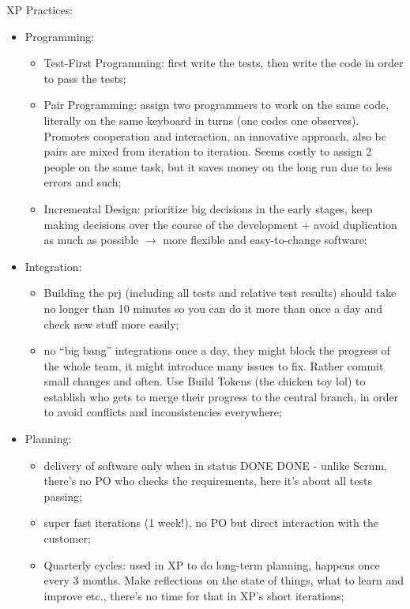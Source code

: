 \noindent XP Practices:
\begin{itemize}
    \item Programming:
    \begin{itemize}
        \item Test-First Programming: first write the tests, then write the code in order to pass the tests;
        \item Pair Programming: assign two programmers to work on the same code, literally on the same keyboard in turns (one codes one observes). Promotes cooperation and interaction, an innovative approach, also bc pairs are mixed from iteration to iteration. Seems costly to assign 2 people on the same task, but it saves money on the long run due to less errors and such;
        \item Incremental Design: prioritize big decisions in the early stages, keep making decisions over the course of the development + avoid duplication as much as possible $\rightarrow$ more flexible and easy-to-change software;
    \end{itemize}
    \item Integration:
    \begin{itemize}
        \item Building the prj (including all tests and relative test results) should take no longer than 10 minutes so you can do it more than once a day and check new stuff more easily;
        \item no ``big bang'' integrations once a day, they might block the progress of the whole team, it might introduce many issues to fix. Rather commit small changes and often. Use Build Tokens (the chicken toy lol) to establish who gets to merge their progress to the central branch, in order to avoid conflicts and inconsistencies everywhere; 
    \end{itemize}
    \item Planning:
    \begin{itemize}
        \item delivery of software only when in status DONE DONE - unlike Scrum, there's no PO who checks the requirements, here it's about all tests passing;
        \item super fast iterations (1 week!), no PO but direct interaction with the customer;
        \item Quarterly cycles: used in XP to do long-term planning, happens once every 3 months. Make reflections on the state of things, what to learn and improve etc., there's no time for that in XP's short iterations;

\end{itemize}
\end{itemize}

